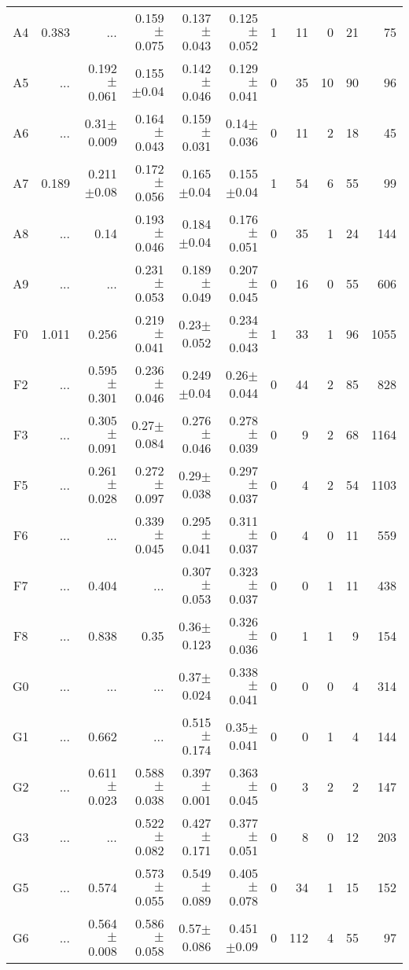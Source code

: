 \begin{table}[t]
\begin{center}
\begin{tabular}{c|rrrrr|rrrrr}
    A4	&	0.383	&	 ...	&	0.159$\pm$0.075	&	0.137$\pm$0.043	&	0.125$\pm$0.052	&	1	&	11	&	0	&	21	&	75	\\
    A5	&	 ...	&	0.192$\pm$0.061	&	0.155$\pm$0.04	&	0.142$\pm$0.046	&	0.129$\pm$0.041	&	0	&	35	&	10	&	90	&	96	\\
    A6	&	 ...	&	0.31$\pm$0.009	&	0.164$\pm$0.043	&	0.159$\pm$0.031	&	0.14$\pm$0.036	&	0	&	11	&	2	&	18	&	45	\\
    A7	&	0.189	&	0.211$\pm$0.08	&	0.172$\pm$0.056	&	0.165$\pm$0.04	&	0.155$\pm$0.04	&	1	&	54	&	6	&	55	&	99	\\
    A8	&	 ...	&	0.14	&	0.193$\pm$0.046	&	0.184$\pm$0.04	&	0.176$\pm$0.051	&	0	&	35	&	1	&	24	&	144	\\
    A9	&	 ...	&	 ...	&	0.231$\pm$0.053	&	0.189$\pm$0.049	&	0.207$\pm$0.045	&	0	&	16	&	0	&	55	&	606	\\
    F0	&	1.011	&	0.256	&	0.219$\pm$0.041	&	0.23$\pm$0.052	&	0.234$\pm$0.043	&	1	&	33	&	1	&	96	&	1055	\\
    F2	&	 ...	&	0.595$\pm$0.301	&	0.236$\pm$0.046	&	0.249$\pm$0.04	&	0.26$\pm$0.044	&	0	&	44	&	2	&	85	&	828	\\
    F3	&	 ...	&	0.305$\pm$0.091	&	0.27$\pm$0.084	&	0.276$\pm$0.046	&	0.278$\pm$0.039	&	0	&	9	&	2	&	68	&	1164	\\
    F5	&	 ...	&	0.261$\pm$0.028	&	0.272$\pm$0.097	&	0.29$\pm$0.038	&	0.297$\pm$0.037	&	0	&	4	&	2	&	54	&	1103	\\
    F6	&	 ...	&	 ...	&	0.339$\pm$0.045	&	0.295$\pm$0.041	&	0.311$\pm$0.037	&	0	&	4	&	0	&	11	&	559	\\
    F7	&	 ...	&	0.404	&	 ...	&	0.307$\pm$0.053	&	0.323$\pm$0.037	&	0	&	0	&	1	&	11	&	438	\\
    F8	&	 ...	&	0.838	&	0.35	&	0.36$\pm$0.123	&	0.326$\pm$0.036	&	0	&	1	&	1	&	9	&	154	\\
    G0	&	 ...	&	 ...	&	 ...	&	0.37$\pm$0.024	&	0.338$\pm$0.041	&	0	&	0	&	0	&	4	&	314	\\
    G1	&	 ...	&	0.662	&	 ...	&	0.515$\pm$0.174	&	0.35$\pm$0.041	&	0	&	0	&	1	&	4	&	144	\\
    G2	&	 ...	&	0.611$\pm$0.023	&	0.588$\pm$0.038	&	0.397$\pm$0.001	&	0.363$\pm$0.045	&	0	&	3	&	2	&	2	&	147	\\
    G3	&	 ...	&	 ...	&	0.522$\pm$0.082	&	0.427$\pm$0.171	&	0.377$\pm$0.051	&	0	&	8	&	0	&	12	&	203	\\
    G5	&	 ...	&	0.574	&	0.573$\pm$0.055	&	0.549$\pm$0.089	&	0.405$\pm$0.078	&	0	&	34	&	1	&	15	&	152	\\
    G6	&	 ...	&	0.564$\pm$0.008	&	0.586$\pm$0.058	&	0.57$\pm$0.086	&	0.451$\pm$0.09	&	0	&	112	&	4	&	55	&	97	\\

\end{tabular}
\end{center}
\end{table}

